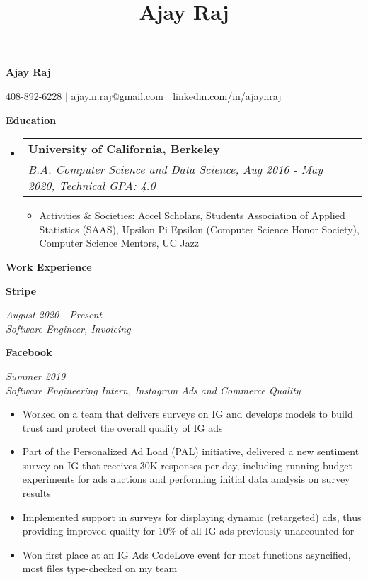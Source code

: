 \documentclass[letterpaper,8pt]{article}
\title{Ajay Raj}
\makeatletter
\newcommand{\resitem}[1]{\item #1 \vspace{-1pt}}
\newcommand{\ressubheading}[4]{
\begin{tabular*}{6.5in}{l@{\extracolsep{\fill}}r}
		\textbf{#1} & #2 \\
		\textit{#3} & \textit{#4} \\
\end{tabular*}\vspace{-6pt}}
\makeatother
\begin{document}
\centerline{\Large{\textbf{Ajay Raj}}}
\centerline{408-892-6228 $\vert$ ajay.n.raj@gmail.com $\vert$ linkedin.com/in/ajaynraj}

\vspace{0.1in}
\textbf{\large{Education}}
\normalsize
{\renewcommand\labelitemi{}
\begin{itemize}
\item
	\ressubheading{University of California, Berkeley}{}{\small{B.A. Computer Science and Data Science, Aug 2016 - May 2020, Technical GPA: 4.0}}{}
	\begin{itemize}[topsep=3pt, noitemsep]
		\resitem{Activities \& Societies: Accel Scholars, Students Association of Applied Statistics (SAAS), Upsilon Pi Epsilon (Computer Science Honor Society), Computer Science Mentors, UC Jazz}
	\end{itemize}

\end{itemize}

\textbf{\large{Work Experience}}
\begin{itemize}

  \small{\item
      \textbf{\small{Stripe}}}\hfill{\textit{August 2020 - Present}} \\
      \textit{\small{Software Engineer, Invoicing}}

  \small{\item
      \textbf{\small{Facebook}}}\hfill{\textit{Summer 2019}} \\
      \textit{\small{Software Engineering Intern, Instagram Ads and Commerce Quality}}
      \begin{itemize}[noitemsep,nolistsep]
		\resitem{\small{Worked on a team that delivers surveys on IG and develops models to build trust and protect the overall quality of IG ads}}
    		\resitem{\small{Part of the Personalized Ad Load (PAL) initiative, delivered a new sentiment survey on IG that receives 30K responses per day, including running budget experiments for ads auctions and performing initial data analysis on survey results}}
		\resitem{\small{Implemented support in surveys for displaying dynamic (retargeted) ads, thus providing improved quality for 10\% of all IG ads previously unaccounted for}}
		\resitem{\small{Won first place at an IG Ads CodeLove event for most functions asyncified, most files type-checked on my team}}
    	\end{itemize}




\end{itemize}}
\end{document}
